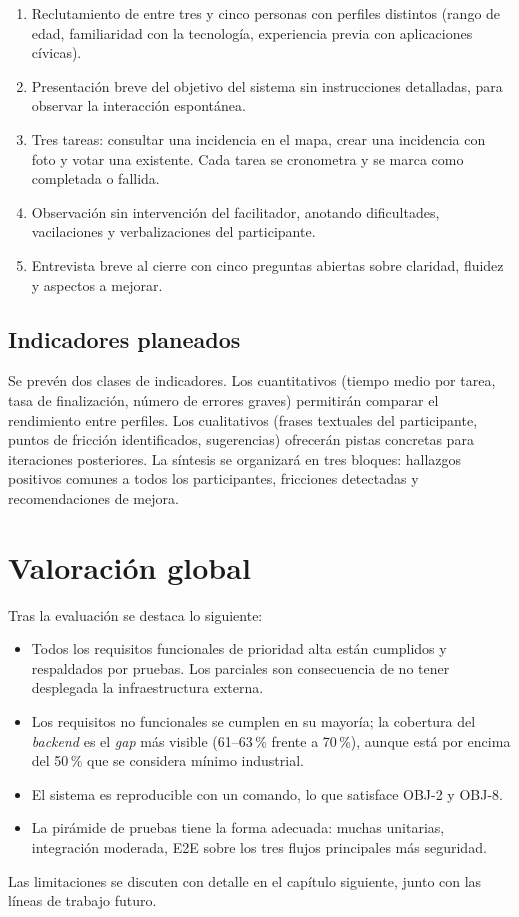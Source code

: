 \begin{enumerate}
  \item Reclutamiento de entre tres y cinco personas con perfiles distintos (rango de edad, familiaridad con la tecnología, experiencia previa con aplicaciones cívicas).
  \item Presentación breve del objetivo del sistema sin instrucciones detalladas, para observar la interacción espontánea.
  \item Tres tareas: consultar una incidencia en el mapa, crear una incidencia con foto y votar una existente. Cada tarea se cronometra y se marca como completada o fallida.
  \item Observación sin intervención del facilitador, anotando dificultades, vacilaciones y verbalizaciones del participante.
  \item Entrevista breve al cierre con cinco preguntas abiertas sobre claridad, fluidez y aspectos a mejorar.
\end{enumerate}

\subsection*{Indicadores planeados}

Se prevén dos clases de indicadores. Los cuantitativos (tiempo medio por tarea, tasa de finalización, número de errores graves) permitirán comparar el rendimiento entre perfiles. Los cualitativos (frases textuales del participante, puntos de fricción identificados, sugerencias) ofrecerán pistas concretas para iteraciones posteriores. La síntesis se organizará en tres bloques: hallazgos positivos comunes a todos los participantes, fricciones detectadas y recomendaciones de mejora.


\section{Valoración global}
\label{sec:valoracion-global}

Tras la evaluación se destaca lo siguiente:

\begin{itemize}
  \item Todos los requisitos funcionales de prioridad alta están cumplidos y respaldados por pruebas. Los parciales son consecuencia de no tener desplegada la infraestructura externa.
  \item Los requisitos no funcionales se cumplen en su mayoría; la cobertura del \textit{backend} es el \textit{gap} más visible (61--63\,\% frente a 70\,\%), aunque está por encima del 50\,\% que se considera mínimo industrial.
  \item El sistema es reproducible con un comando, lo que satisface OBJ-2 y OBJ-8.
  \item La pirámide de pruebas tiene la forma adecuada: muchas unitarias, integración moderada, E2E sobre los tres flujos principales más seguridad.
\end{itemize}

Las limitaciones se discuten con detalle en el capítulo siguiente, junto con las líneas de trabajo futuro.
